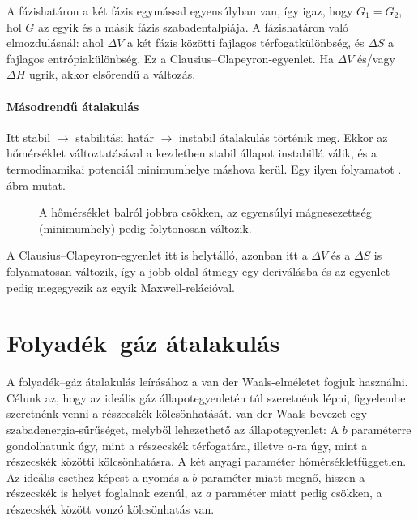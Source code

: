    A fázishatáron a két fázis egymással egyensúlyban van, így igaz, hogy $G_1=G_2$, hol $G$ az egyik és a másik fázis szabadentalpiája.
   A fázishatáron való elmozdulásnál:
   ahol $\Delta V$ a két fázis közötti fajlagos térfogatkülönbség, és $\Delta S$ a fajlagos entrópiakülönbség.
   Ez a Clausius--Clapeyron-egyenlet.
   Ha $\Delta V$ és/vagy $\Delta H$ ugrik, akkor elsőrendű a változás.
  
  \paragraph{Másodrendű átalakulás} 
  
   Itt stabil $\rightarrow$ stabilitási határ $\rightarrow$ instabil átalakulás történik meg.
   Ekkor az hőmérséklet változtatásával a kezdetben stabil állapot instabillá válik, és a termodinamikai potenciál minimumhelye máshova kerül.
   Egy ilyen folyamatot . ábra mutat.
  \begin{figure}[ht!]
   \centering
    \hspace{6pt}
    \hspace{6pt}
   \caption{A hőmérséklet balról jobbra csökken, az egyensúlyi mágnesezettség (minimumhely) pedig folytonosan változik.}\label{fig:B09-masodrend}
  \end{figure}
  
  A Clausius--Clapeyron-egyenlet itt is helytálló, azonban itt a $\Delta V$ és a $\Delta S$ is folyamatosan változik, így a jobb oldal átmegy egy deriválásba és az egyenlet pedig megegyezik az egyik Maxwell-relációval.
  
  \section{Folyadék--gáz átalakulás}\label{ss:B09-vdW}
   
   A folyadék--gáz átalakulás leírásához a van der Waals-elméletet fogjuk használni.
   Célunk az, hogy az ideális gáz állapotegyenletén túl szeretnénk lépni, figyelembe szeretnénk venni a részecskék kölcsönhatását. van der Waals bevezet egy szabadenergia-sűrűséget, melyből lehezethető az állapotegyenlet:
   A $b$ paraméterre gondolhatunk úgy, mint a részecskék térfogatára, illetve $a$-ra úgy, mint a részecskék közötti kölcsönhatásra.
   A két anyagi paraméter hőmérsékletfüggetlen.
   Az ideális esethez képest a nyomás a $b$ paraméter miatt megnő, hiszen a részecskék is helyet foglalnak ezenúl, az $a$ paraméter miatt pedig csökken, a részecskék között vonzó kölcsönhatás van. 
   
